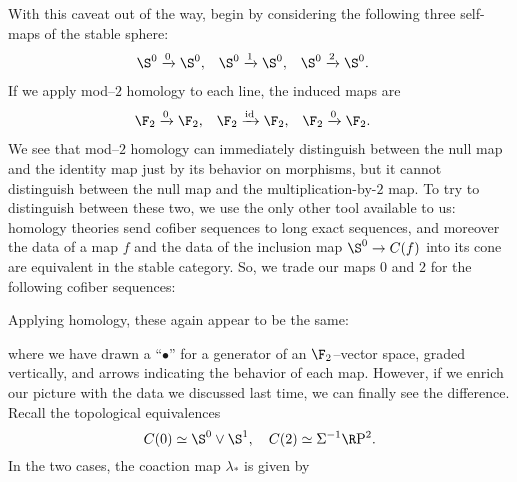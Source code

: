 With this caveat out of the way, begin by considering the following three self-maps of the stable sphere:
\begin{align*}
\S^0 & \xrightarrow{0} \S^0, & \S^0 & \xrightarrow{1} \S^0, & \S^0 & \xrightarrow{2} \S^0.
\end{align*}
If we apply mod--$2$ homology to each line, the induced maps are
\begin{align*}
\F_2 & \xrightarrow{0} \F_2, & \F_2 & \xrightarrow{\id} \F_2, & \F_2 & \xrightarrow{0} \F_2.
\end{align*}
We see that mod--$2$ homology can immediately distinguish between the null map and the identity map just by its behavior on morphisms, but it cannot distinguish between the null map and the multiplication-by-$2$ map.  To try to distinguish between these two, we use the only other tool available to us: homology theories send cofiber sequences to long exact sequences, and moreover the data of a map $f$ and the data of the inclusion map $\S^0 \to C(f)$ into its cone are equivalent in the stable category.  So, we trade our maps $0$ and $2$ for the following cofiber sequences:
\begin{center}
\end{center}
Applying homology, these again appear to be the same:
\begin{center}
\end{center}
where we have drawn a ``$\bullet$'' for a generator of an $\F_2$--vector space, graded vertically, and arrows indicating the behavior of each map.  However, if we enrich our picture with the data we discussed last time, we can finally see the difference.  Recall the topological equivalences \[C(0) \simeq \S^0 \vee \S^1, \quad C(2) \simeq \Susp^{-1} \RP^2.\]  In the two cases, the coaction map $\lambda_*$ is given by
